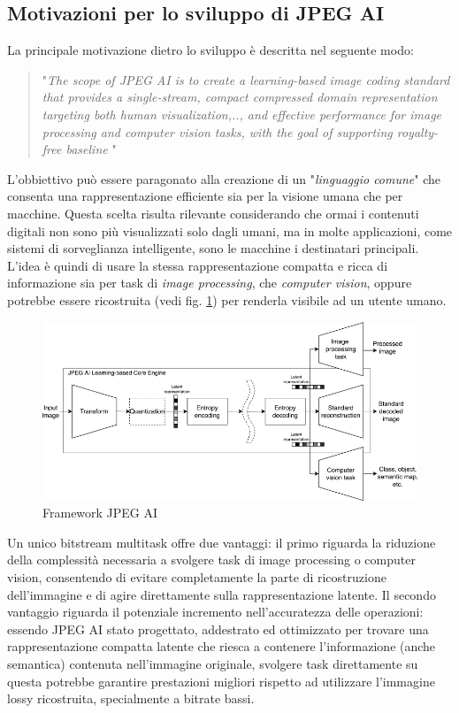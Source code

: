 \subsection{Motivazioni per lo sviluppo di JPEG AI}
La principale motivazione dietro lo sviluppo è descritta nel seguente modo:
\begin{quote}
    "\textit{The scope of JPEG AI is to create a learning-based image coding standard that provides a single-stream, compact compressed domain representation targeting both human visualization,.., and effective performance for image processing and computer vision tasks, with the goal of supporting royalty-free baseline} \cite{ascenso2023jpegAI}"
\end{quote} L'obbiettivo può essere paragonato alla creazione di un "\textit{linguaggio comune}" che consenta una rappresentazione efficiente sia per la visione umana che per macchine. Questa scelta risulta rilevante considerando che ormai i contenuti digitali non sono più visualizzati solo dagli umani, ma in molte applicazioni, come sistemi di sorveglianza intelligente, sono le macchine i destinatari principali.
L'idea è quindi di usare la stessa rappresentazione compatta e ricca di informazione sia per task di \textit{image processing}, che \textit{computer vision}, oppure potrebbe essere ricostruita (vedi fig. \ref{fig:fig:jpeg_frw}) per renderla visibile ad un utente umano.\\
\begin{figure}
    \centering
    \includegraphics[width=1\linewidth]{img/JPEG AI.png}
    \caption{Framework JPEG AI}
    \label{fig:fig:jpeg_frw}
\end{figure}
Un unico bitstream multitask offre due vantaggi: il primo riguarda la riduzione della complessità necessaria a svolgere task di image processing o computer vision, consentendo di evitare completamente la parte di ricostruzione dell'immagine e di agire direttamente sulla rappresentazione latente. Il secondo vantaggio riguarda il potenziale incremento nell'accuratezza delle operazioni: essendo JPEG AI stato progettato, addestrato ed ottimizzato per trovare una rappresentazione compatta latente che riesca a contenere l'informazione (anche semantica) contenuta nell'immagine originale, svolgere task direttamente su questa potrebbe garantire prestazioni migliori rispetto ad utilizzare l'immagine lossy ricostruita, specialmente a bitrate bassi.\\
